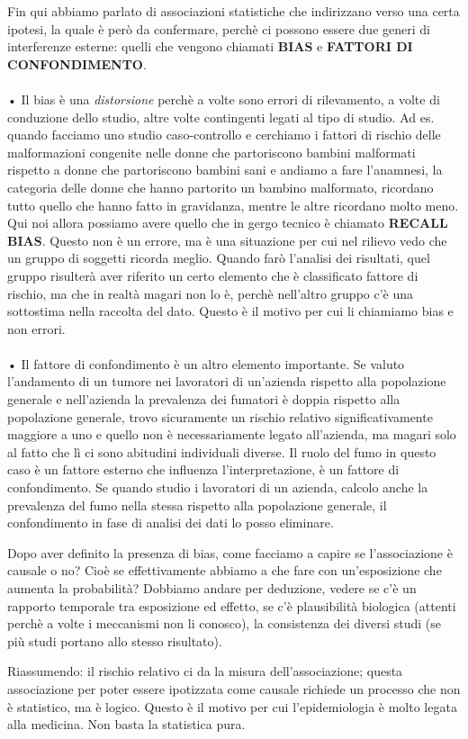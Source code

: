 Fin qui abbiamo parlato di associazioni statistiche che indirizzano
verso una certa ipotesi, la quale è però da confermare, perchè ci
possono essere due generi di interferenze esterne: quelli che vengono
chiamati \textbf{BIAS} e \textbf{FATTORI DI CONFONDIMENTO}.
\\\\
• Il bias è una \emph{distorsione} perchè a volte sono errori di
rilevamento, a volte di conduzione dello studio, altre volte contingenti
legati al tipo di studio. Ad es. quando facciamo uno studio
caso-controllo e cerchiamo i fattori di rischio delle malformazioni
congenite nelle donne che partoriscono bambini malformati rispetto a
donne che partoriscono bambini sani e andiamo a fare l'anamnesi, la
categoria delle donne che hanno partorito un bambino malformato,
ricordano tutto quello che hanno fatto in gravidanza, mentre le altre
ricordano molto meno. Qui noi allora possiamo avere quello che in gergo
tecnico è chiamato \textbf{RECALL BIAS}. Questo non è un errore, ma è
una situazione per cui nel rilievo vedo che un gruppo di soggetti
ricorda meglio. Quando farò l'analisi dei risultati, quel gruppo
risulterà aver riferito un certo elemento che è classificato fattore di
rischio, ma che in realtà magari non lo è, perchè nell'altro gruppo c'è
una sottostima nella raccolta del dato. Questo è il motivo per cui li
chiamiamo bias e non errori.
\\\\
• Il fattore di confondimento è un altro elemento importante. Se valuto
l'andamento di un tumore nei lavoratori di un'azienda rispetto alla
popolazione generale e nell'azienda la prevalenza dei fumatori è doppia
rispetto alla popolazione generale, trovo sicuramente un rischio
relativo significativamente maggiore a uno e quello non è
necessariamente legato all'azienda, ma magari solo al fatto che lì ci
sono abitudini individuali diverse. Il ruolo del fumo in questo caso è
un fattore esterno che influenza l'interpretazione, è un fattore di
confondimento. Se quando studio i lavoratori di un azienda, calcolo
anche la prevalenza del fumo nella stessa rispetto alla popolazione
generale, il confondimento in fase di analisi dei dati lo posso
eliminare.

Dopo aver definito la presenza di bias, come facciamo a capire se
l'associazione è causale o no? Cioè se effettivamente abbiamo a che fare
con un'esposizione che aumenta la probabilità? Dobbiamo andare per
deduzione, vedere se c'è un rapporto temporale tra esposizione ed
effetto, se c'è plausibilità biologica (attenti perchè a volte i
meccanismi non li conosco), la consistenza dei diversi studi (se più
studi portano allo stesso risultato).

Riassumendo: il rischio relativo ci da la misura dell'associazione;
questa associazione per poter essere ipotizzata come causale richiede un
processo che non è statistico, ma è logico. Questo è il motivo per cui
l'epidemiologia è molto legata alla medicina. Non basta la statistica
pura.

